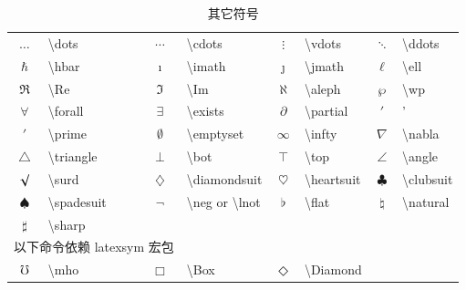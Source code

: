 \documentclass[a4paper]{ctexart}
\begin{document}
    \begin{table}[H]  
        \centering  
        \caption{其它符号}
        \begin{tabular}{clclclcl}
            \toprule
            $\dots$         & \textbackslash dots       & $\cdots$          & \textbackslash cdots                          &
            $\vdots$        & \textbackslash vdots      & $\ddots$          & \textbackslash ddots                          \\
            $\hbar$         & \textbackslash hbar       & $\imath$          & \textbackslash imath                          &
            $\jmath$        & \textbackslash jmath      & $\ell$            & \textbackslash ell                            \\
            $\Re$           & \textbackslash Re         & $\Im$             & \textbackslash Im                             &
            $\aleph$        & \textbackslash aleph      & $\wp$             & \textbackslash wp                             \\
            $\forall$       & \textbackslash forall     & $\exists$         & \textbackslash exists                         &  
            $\partial$      & \textbackslash partial    & $'$               & '                                             \\ 
            $\prime$        & \textbackslash prime      & $\emptyset$       & \textbackslash emptyset                       &
            $\infty$        & \textbackslash infty      & $\nabla$          & \textbackslash nabla                          \\ 
            $\triangle$     & \textbackslash triangle   & $\bot$            & \textbackslash bot                            &
            $\top$          & \textbackslash top        & $\angle$          & \textbackslash angle                          \\
            $\surd$         & \textbackslash surd       & $\diamondsuit$    & \textbackslash diamondsuit                    &
            $\heartsuit$    & \textbackslash heartsuit  & $\clubsuit$       & \textbackslash clubsuit                       \\ 
            $\spadesuit$    & \textbackslash spadesuit  & $\neg$            & \textbackslash neg or \textbackslash lnot     &
            $\flat$         & \textbackslash flat       & $\natural$        & \textbackslash natural                        \\
            $\sharp$        & \textbackslash sharp                                                                          \\
            \midrule
            \multicolumn{3}{l}{以下命令依赖 latexsym 宏包}\\
            $\mho$          & \textbackslash mho        & $\Box$            & \textbackslash Box                            &
            $\Diamond$      & \textbackslash Diamond                                                                        \\
            \bottomrule
        \end{tabular}    
    \end{table}
\end{document}
